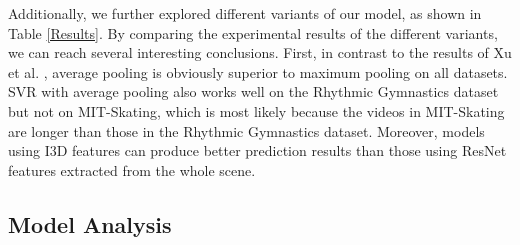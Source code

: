 \documentclass[sigconf]{acmart}
\begin{document}
Additionally, we further explored different variants of our model, as shown in Table \ref{Results}. By comparing the experimental results of the different variants, we can reach several interesting conclusions. First, in contrast to the results of Xu et al. \cite{xu2019learning}, average pooling is obviously superior to maximum pooling on all datasets.
SVR with average pooling also works well on the Rhythmic Gymnastics dataset but not on MIT-Skating, which is most likely because the videos in MIT-Skating are longer than those in the Rhythmic Gymnastics dataset. Moreover, models using I3D features can produce better prediction results than those using ResNet features extracted from the whole scene.

\vspace{-0.1cm}




\subsection{Model Analysis}

\begin{table}[]
\vspace{0.2cm}
\caption{Ablation study showing the contribution of the context-aware attention module in our method.
}
\label{tab:ablation stduy 2}
\vspace{-0.7cm}
\end{table}
\end{document}
